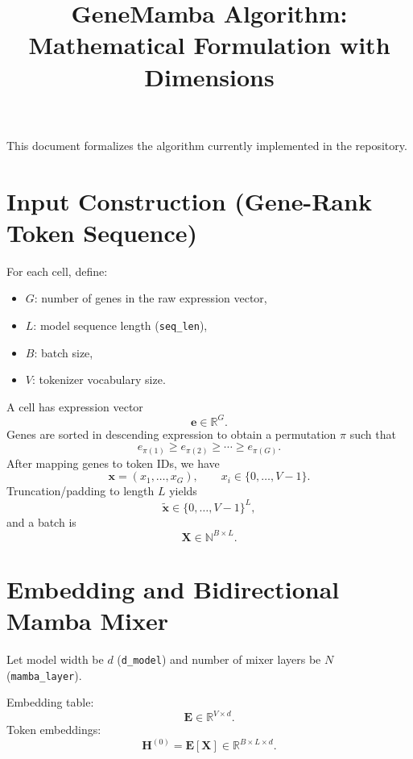 \documentclass[11pt]{article}
\title{GeneMamba Algorithm: Mathematical Formulation with Dimensions}
\author{}
\date{}
\begin{document}
\maketitle

This document formalizes the algorithm currently implemented in the repository.

\section{Input Construction (Gene-Rank Token Sequence)}
For each cell, define:
\begin{itemize}[leftmargin=2em]
  \item $G$: number of genes in the raw expression vector,
  \item $L$: model sequence length (\texttt{seq\_len}),
  \item $B$: batch size,
  \item $V$: tokenizer vocabulary size.
\end{itemize}

A cell has expression vector
\begin{equation}
\bm{e} \in \mathbb{R}^{G}.
\end{equation}
Genes are sorted in descending expression to obtain a permutation $\pi$ such that
\begin{equation}
e_{\pi(1)} \ge e_{\pi(2)} \ge \cdots \ge e_{\pi(G)}.
\end{equation}
After mapping genes to token IDs, we have
\begin{equation}
\bm{x} = (x_1,\ldots,x_G),\qquad x_i \in \{0,\ldots,V-1\}.
\end{equation}
Truncation/padding to length $L$ yields
\begin{equation}
\tilde{\bm{x}} \in \{0,\ldots,V-1\}^{L},
\end{equation}
and a batch is
\begin{equation}
\bm{X} \in \mathbb{N}^{B\times L}.
\end{equation}

\section{Embedding and Bidirectional Mamba Mixer}
Let model width be $d$ (\texttt{d\_model}) and number of mixer layers be $N$ (\texttt{mamba\_layer}).

Embedding table:
\begin{equation}
\bm{E} \in \mathbb{R}^{V\times d}.
\end{equation}
Token embeddings:
\begin{equation}
\bm{H}^{(0)} = \bm{E}[\bm{X}] \in \mathbb{R}^{B\times L\times d}.
\end{equation}
\end{document}
